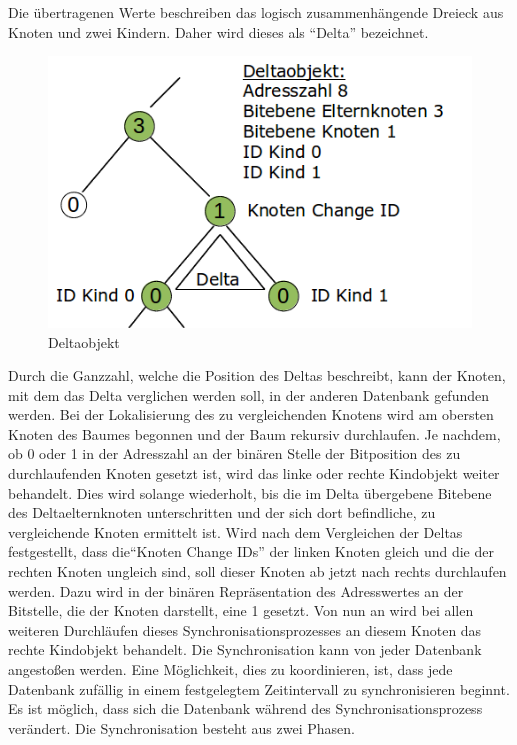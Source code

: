 \documentclass[a4paper,11pt,oneside,%
headsepline,												%
footsepline,												%
bibtotocnumbered									%
]{scrreprt}
\begin{document}
Die übertragenen Werte beschreiben das logisch zusammenhängende Dreieck aus Knoten und zwei Kindern. Daher wird dieses als \enquote{Delta} bezeichnet.\\
\begin{figure}
  \begin{center}
    \includegraphics[width=.8\linewidth]{bilder/SynchroDelta.png}
  \end{center}
 \caption{Deltaobjekt}
\end{figure}
Durch die Ganzzahl, welche die Position des Deltas beschreibt, kann der Knoten, mit dem das Delta verglichen werden soll, in der anderen Datenbank gefunden werden. Bei der Lokalisierung des zu vergleichenden Knotens wird am obersten Knoten des Baumes begonnen und der Baum rekursiv durchlaufen. Je nachdem, ob 0 oder 1 in der Adresszahl an der binären Stelle der Bitposition des zu durchlaufenden Knoten gesetzt ist, wird das linke oder rechte Kindobjekt weiter behandelt. Dies wird solange wiederholt, bis die im Delta übergebene Bitebene des Deltaelternknoten unterschritten und der sich dort befindliche, zu vergleichende Knoten ermittelt ist.
Wird nach dem Vergleichen der Deltas festgestellt, dass die\enquote{Knoten Change IDs} der linken Knoten gleich und die der rechten Knoten ungleich sind, soll dieser Knoten ab jetzt nach rechts durchlaufen werden. Dazu wird in der binären Repräsentation des Adresswertes an der Bitstelle, die der Knoten darstellt, eine 1 gesetzt. Von nun an wird bei allen weiteren Durchläufen dieses Synchronisationsprozesses an diesem Knoten das rechte Kindobjekt behandelt.
Die Synchronisation kann von jeder Datenbank angestoßen werden. Eine Möglichkeit, dies zu koordinieren, ist, dass jede Datenbank zufällig in einem festgelegtem Zeitintervall zu synchronisieren beginnt. Es ist möglich, dass sich die Datenbank während des Synchronisationsprozess verändert. Die Synchronisation besteht aus zwei Phasen.  
\end{document}
